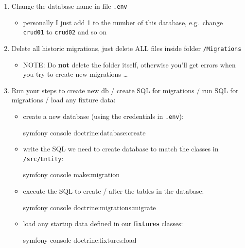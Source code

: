 \documentclass[a4paperpaper,openright]{book}
\newenvironment{Shaded}{}{}
\newcommand{\ExtensionTok}[1]{#1}
\newcommand{\NormalTok}[1]{#1}
\providecommand{\tightlist}{%
  \setlength{\itemsep}{0pt}\setlength{\parskip}{0pt}}
\begin{document}
\begin{enumerate}
\def\labelenumi{\arabic{enumi}.}
\item
  Change the database name in file \texttt{.env}

  \begin{itemize}
  \tightlist
  \item
    personally I just add 1 to the number of this database, e.g.~change
    \texttt{crud01} to \texttt{crud02} and so on
  \end{itemize}
\item
  Delete all historic migrations, just delete ALL files inside folder
  \texttt{/Migrations}

  \begin{itemize}
  \tightlist
  \item
    NOTE: Do \textbf{not} delete the folder itself, otherwise you'll get
    errors when you try to create new migrations \ldots{}
  \end{itemize}
\item
  Run your steps to create new db / create SQL for migrations / run SQL
  for migrations / load any fixture data:

  \begin{itemize}
  \item
    create a new database (using the credentials in \texttt{.env}):

\begin{Shaded}
\begin{Highlighting}[]
\ExtensionTok{symfony}\NormalTok{ console doctrine:database:create}
\end{Highlighting}
\end{Shaded}
  \item
    write the SQL we need to create database to match the classes in
    \texttt{/src/Entity}:

\begin{Shaded}
\begin{Highlighting}[]
\ExtensionTok{symfony}\NormalTok{ console make:migration}
\end{Highlighting}
\end{Shaded}
  \item
    execute the SQL to create / alter the tables in the database:

\begin{Shaded}
\begin{Highlighting}[]
\ExtensionTok{symfony}\NormalTok{ console doctrine:migrations:migrate}
\end{Highlighting}
\end{Shaded}
  \item
    load any startup data defined in our \textbf{fixtures} classes:

\begin{Shaded}
\begin{Highlighting}[]
\ExtensionTok{symfony}\NormalTok{ console doctrine:fixtures:load}
\end{Highlighting}
\end{Shaded}
  \end{itemize}
\end{enumerate}
\end{document}
